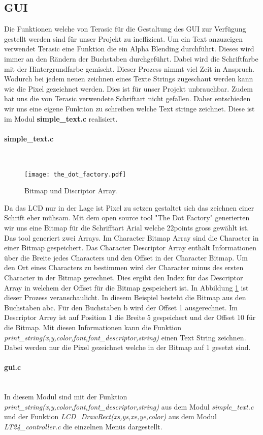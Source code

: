 \subsection{GUI}\label{subsec:gui}
Die Funktionen welche von Terasic für die Gestaltung des GUI zur Verfügung gestellt werden sind für unser Projekt zu ineffizient. Um ein Text anzuzeigen verwendet Terasic eine Funktion die ein Alpha Blending durchführt. Dieses wird immer an den Rändern der Buchstaben durchgeführt. Dabei wird die Schriftfarbe mit der Hintergrundfarbe gemischt. Dieser Prozess nimmt viel Zeit in Anspruch. Wodurch bei jedem neuen zeichnen eines Texte Strings zugeschaut werden kann wie die Pixel gezeichnet werden. Dies ist für unser Projekt unbrauchbar. Zudem hat uns die von Terasic verwendete Schriftart nicht gefallen. Daher entschieden wir uns eine eigene Funktion zu schreiben welche Text stringe zeichnet. Diese ist im Modul  \textbf{simple\_text.c} realisiert.

\paragraph{simple\_text.c}\mbox{}\\
\begin{figure}[h]
	\centering
	\texttt{[image: the\_dot\_factory.pdf]}
	\caption{Bitmap und Discriptor Array.}
	\label{img:bitmap}
\end{figure}
Da das LCD nur in der Lage ist Pixel zu setzen gestaltet sich das zeichnen einer Schrift eher mühsam. Mit dem open source tool "The Dot Factory" generierten wir uns eine Bitmap für die Schrifftart Arial welche 22points gross gewählt ist. Das tool generiert zwei Arrays. Im Character Bitmap Array sind die Character in einer Bitmap gespeichert. Das Character Descriptor Array enthält Informationen über die Breite jedes Characters und den Offset in der Character Bitmap. Um den Ort eines Characters zu bestimmen wird der Character minus des ersten Character in der Bitmap gerechnet.  Dies ergibt den Index für das Descriptor Array in welchem der Offset für die Bitmap gespeichert ist. In Abbildung \ref{img:bitmap} ist dieser Prozess veranschaulicht. In diesem Beispiel besteht die Bitmap aus den Buchstaben abc. Für den Buchstaben b wird der Offset 1 ausgerechnet. Im Descriptor Arrey ist auf Position 1 die Breite 5 gespeichert und der Offset 10 für die Bitmap. Mit diesen Informationen kann die Funktion \textit{print\_string(x,y,color,font,font\_descriptor,string)} einen Text String zeichnen. Dabei werden nur die Pixel gezeichnet welche in der Bitmap auf 1 gesetzt sind.


\paragraph{gui.c} \mbox{}\\
In diesem Modul sind mit der Funktion \textit{print\_string(x,y,color,font,font\_descriptor,string)} aus dem Modul  \textit{simple\_text.c} und der Funktion \textit{LCD\_DrawRect(xs,ys,xe,ye,color)} aus dem Modul \textit{LT24\_controller.c} die einzelnen Menüs dargestellt. 